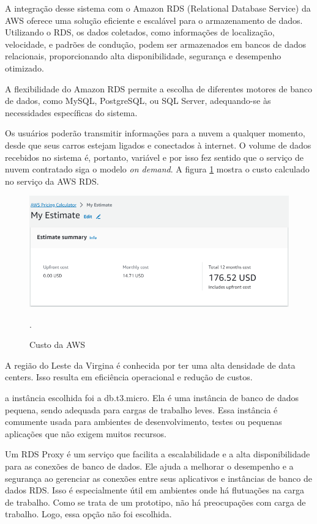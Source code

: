 A integração desse sistema com o Amazon RDS (Relational Database Service) da AWS oferece uma solução eficiente e escalável para o armazenamento de dados. Utilizando o RDS, os dados coletados, como informações de localização, velocidade, e padrões de condução, podem ser armazenados em bancos de dados relacionais, proporcionando alta disponibilidade, segurança e desempenho otimizado. 

A flexibilidade do Amazon RDS permite a escolha de diferentes motores de banco de dados, como MySQL, PostgreSQL, ou SQL Server, adequando-se às necessidades específicas do sistema.

Os usuários poderão transmitir informações para a nuvem a qualquer momento, desde que seus carros estejam ligados e conectados à internet. O volume de dados recebidos no sistema é, portanto, variável e por isso fez sentido que o serviço de nuvem contratado siga o modelo \textit{on demand}. A figura \ref{figure:custo_aws_inicial} mostra o custo calculado no serviço da AWS RDS.

\begin{figure}[hp]
    \centering
    
    \includegraphics[scale=0.8]{figures/custo_aws_inicial.PNG}
    \caption{Custo da AWS}.
    \label{figure:custo_aws_inicial}
    
\end{figure}

A região do Leste da Virgina é conhecida por ter uma alta densidade de data centers. Isso resulta em eficiência operacional e redução de custos.

a instância escolhida foi a db.t3.micro. Ela é uma instância de banco de dados pequena, sendo adequada para cargas de trabalho leves. Essa instância é comumente usada para ambientes de desenvolvimento, testes ou pequenas aplicações que não exigem muitos recursos.

Um RDS Proxy é um serviço que facilita a escalabilidade e a alta disponibilidade para as conexões de banco de dados. Ele ajuda a melhorar o desempenho e a segurança ao gerenciar as conexões entre seus aplicativos e instâncias de banco de dados RDS. Isso é especialmente útil em ambientes onde há flutuações na carga de trabalho. Como se trata de um prototipo, não há preocupações com carga de trabalho. Logo, essa opção não foi escolhida.

